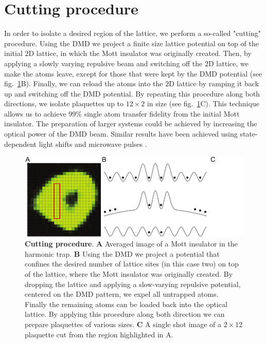 \section{Cutting procedure}

In order to isolate a desired region of the lattice, we perform a so-called "cutting" procedure. Using the DMD we project a finite size lattice potential on top of the initial $2\mathrm{D}$ lattice, in which the Mott insulator was originally created. Then, by applying a slowly varying repulsive beam and switching off the $2\mathrm{D}$ lattice, we make the atoms leave, except for those that were kept by the DMD potential (see fig.~\ref{fig:CTE_cutting}B). Finally, we can reload the atoms into the $2\mathrm{D}$ lattice by ramping it back up and switching off the DMD potential. By repeating this procedure along both directions, we isolate plaquettes up to $12\times2$ in size (see fig.~\ref{fig:CTE_cutting}C). This technique allows us to achieve $99\%$ single atom transfer fidelity from the initial Mott insulator. The preparation of larger systems could be achieved by increasing the optical power of the DMD beam. Similar results have been achieved using state-dependent light shifts and microwave pulses \cite{Bloch single site addresing}.

\begin{figure}[t]
	\centering
	\includegraphics[scale=1]{figures/CTE_cutting.pdf}
	\caption{{\bf Cutting procedure}. {\bf A} Averaged image of a Mott insulator in the harmonic trap. {\bf B} Using the DMD we project a potential that confines the desired number of lattice sites (in this case two) on top of the lattice, where the Mott insulator was originally created. By dropping the lattice and applying a slow-varying repulsive potential, centered on the DMD pattern, we expel all untrapped atoms. Finally the remaining atoms can be loaded back into the optical lattice. By applying this procedure along both direction we can prepare plaquettes of various sizes. {\bf C} A single shot image of a $2 \times 12$ plaquette cut from the region highlighted in A.}
	\label{fig:CTE_cutting}
\end{figure}

